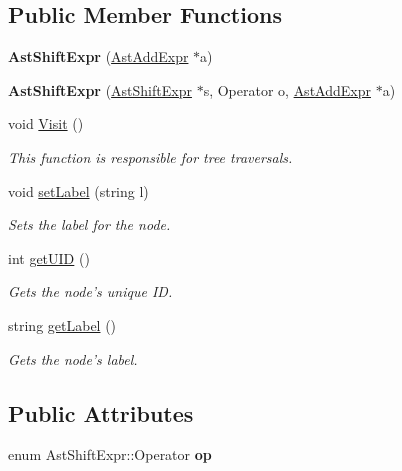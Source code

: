 \subsection*{Public Member Functions}
\begin{DoxyCompactItemize}
\item 
\hypertarget{classAstShiftExpr_ae85c464914cce70d3ebb4f51b898781f}{{\bfseries Ast\-Shift\-Expr} (\hyperlink{classAstAddExpr}{Ast\-Add\-Expr} $\ast$a)}\label{classAstShiftExpr_ae85c464914cce70d3ebb4f51b898781f}

\item 
\hypertarget{classAstShiftExpr_a9c8c73a11d9e4da6264b1d83d4339cdb}{{\bfseries Ast\-Shift\-Expr} (\hyperlink{classAstShiftExpr}{Ast\-Shift\-Expr} $\ast$s, Operator o, \hyperlink{classAstAddExpr}{Ast\-Add\-Expr} $\ast$a)}\label{classAstShiftExpr_a9c8c73a11d9e4da6264b1d83d4339cdb}

\item 
void \hyperlink{classAstShiftExpr_ae20f0c9604ec1ca74911337e3ed375e5}{Visit} ()
\begin{DoxyCompactList}\small\item\em This function is responsible for tree traversals. \end{DoxyCompactList}\item 
void \hyperlink{classAST_a71d680856e95ff89f55d5311a552eba6}{set\-Label} (string l)
\begin{DoxyCompactList}\small\item\em Sets the label for the node. \end{DoxyCompactList}\item 
int \hyperlink{classAST_ab7a5b1d9f1c2de0d98deb356f724a42c}{get\-U\-I\-D} ()
\begin{DoxyCompactList}\small\item\em Gets the node's unique I\-D. \end{DoxyCompactList}\item 
string \hyperlink{classAST_aee029be902fffc927d16ccb03eb922ad}{get\-Label} ()
\begin{DoxyCompactList}\small\item\em Gets the node's label. \end{DoxyCompactList}\end{DoxyCompactItemize}
\subsection*{Public Attributes}
\begin{DoxyCompactItemize}
\item 
\hypertarget{classAstShiftExpr_a637fba35ffc19fe4da9569d92ab704ea}{enum Ast\-Shift\-Expr\-::\-Operator {\bfseries op}}\label{classAstShiftExpr_a637fba35ffc19fe4da9569d92ab704ea}

\end{DoxyCompactItemize}
